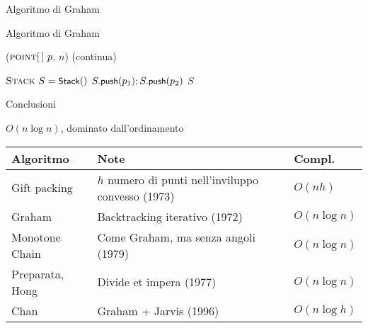 \begin{frame}{Algoritmo di Graham}

\vspace{-12pt}

\end{frame}

\begin{frame}{Algoritmo di Graham}

\begin{Procedure}
\caption[A]{\Stack \graham($\textsc{point}[\,]\ p$, \INTEGER $n$) (continua)}
$\textsc{Stack}\ S = \textsf{{\small Stack}}()$\;
$S.\textsf{{\small push}}(p_1); S.\textsf{{\small push}}(p_2)$\;
\Return $S$\;  
\end{Procedure}


\end{frame}

\begin{frame}{Conclusioni}

\vspace{-9pt}
\begin{myboxtitle}
$O(n \log n)$, dominato dall'ordinamento
\end{myboxtitle}

\medskip
\begin{tabular}{|P{3cm}|P{5.8cm}|P{1.8cm}|}
\hline
\textbf{Algoritmo} & \textbf{Note} & \textbf{Compl.} \\\hline
Gift packing & $h$ numero di punti nell'inviluppo convesso (1973)& $O(nh)$\\\hline
Graham  & Backtracking iterativo (1972)& $O(n \log n)$\\\hline
Monotone Chain  & Come Graham, ma senza angoli (1979) & $O(n \log n)$ \\\hline
Preparata, Hong  & Divide et impera (1977) & $O(n \log n)$ \\\hline
Chan  & Graham + Jarvis (1996) & $O(n \log h)$ \\\hline
\end{tabular}




\end{frame}

